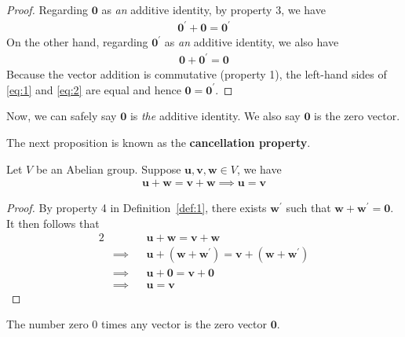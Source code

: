 \documentclass[thmcnt=section, color=cyan, 12pt]{my-elegantbook}
\begin{document}
\begin{proof}
	Regarding $\mathbf{0}$ as \textit{an} additive identity, by property 3,
	we have
	\begin{align}
		\mathbf{0}^\prime + \mathbf{0} = \mathbf{0}^\prime
		\label{eq:1}
	\end{align}
	On the other hand, regarding $\mathbf{0}^\prime$ as \textit{an} additive identity,
	we also have
	\begin{align}
		\mathbf{0} + \mathbf{0}^\prime = \mathbf{0}
		\label{eq:2}
	\end{align}
	Because the vector addition is commutative (property 1),
	the left-hand sides of \eqref{eq:1} and \eqref{eq:2} are equal
	and hence $\mathbf{0} = \mathbf{0}^\prime$.
\end{proof}

Now, we can safely say $\mathbf{0}$ is \textit{the} additive identity.
We also say $\mathbf{0}$ is the zero vector.

The next proposition is known as
the \textbf{cancellation property}.

\begin{proposition}
	Let $V$ be an Abelian group.
	Suppose $\mathbf{u}, \mathbf{v}, \mathbf{w} \in V$, we have
	\begin{align*}
		\mathbf{u} + \mathbf{w} = \mathbf{v} + \mathbf{w}
		\implies \mathbf{u} = \mathbf{v}
	\end{align*}
\end{proposition}

\begin{proof}
	By property 4 in Definition~\ref{def:1}, there exists $\mathbf{w}^\prime$
	such that $\mathbf{w} + \mathbf{w}^\prime = \mathbf{0}$.
	It then follows that
	\begin{alignat*}{2}
		 & \quad    &  & \mathbf{u} + \mathbf{w} = \mathbf{v} + \mathbf{w} \\
		 & \implies &  & \mathbf{u} + (\mathbf{w}+ \mathbf{w}^\prime)
		= \mathbf{v} + (\mathbf{w} + \mathbf{w}^\prime)                    \\
		 & \implies &  & \mathbf{u} + \mathbf{0}
		= \mathbf{v} + \mathbf{0}                                          \\
		 & \implies &  & \mathbf{u} = \mathbf{v}
	\end{alignat*}
\end{proof}

The number zero $0$ times any vector is the zero vector $\mathbf{0}$.
\end{document}
